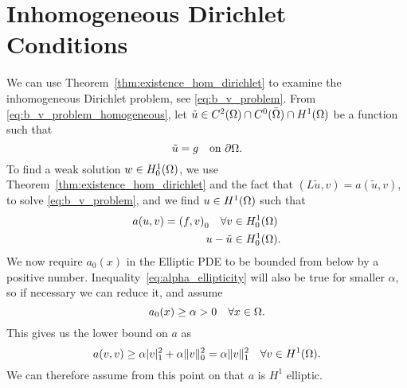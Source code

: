 \section{Inhomogeneous Dirichlet Conditions}
We can use Theorem~\ref{thm:existence_hom_dirichlet} to examine the inhomogeneous Dirichlet problem, 
see \eqref{eq:b_v_problem}. From \eqref{eq:b_v_problem_homogeneous}, let 
$\tilde{u} \in C^2(\Omega)\cap C^0(\bar{\Omega}) \cap H^1(\Omega)$ be a function such that 
\begin{equation*}
   \tilde{u} = g \quad \text{on } \partial \Omega.
\end{equation*}
To find a weak solution $w \in H_0^1(\Omega)$, we use Theorem~\ref{thm:existence_hom_dirichlet} and the 
fact that $(L\tilde{u},v) = a(\tilde{u},v)$, to solve \eqref{eq:b_v_problem}, and
we find $u \in H^1(\Omega)$ such that 
\begin{align*}
   a(u,v) = {(f,v)}_0 \quad \forall v &\in H_0^1(\Omega) \\
   u-\tilde{u} & \in H_0^1(\Omega).
\end{align*}
We now require $a_0(x)$ in the Elliptic PDE to be bounded from below by a positive number. 
Inequality~\eqref{eq:alpha_ellipticity} will also be true for smaller $\alpha$, so if 
necessary we can reduce it, and assume 
\begin{equation*}
  a_0(x) \geq \alpha >0 \quad \forall x \in \Omega.
\end{equation*}
This gives us the lower bound on $a$ as 
\begin{equation*}
   a(v,v)  \geq \alpha |v|^2_1 + \alpha \|v\|^2_0 = \alpha \|v\|^2_1 \quad \forall v \in H^1(\Omega).
\end{equation*}
We can therefore assume from this point on that $a$ is $H^1$ elliptic.

